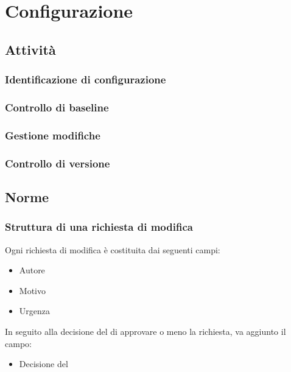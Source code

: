 \section{Configurazione}
	\subsection{Attività}
		\subsubsection{Identificazione di configurazione}
		\subsubsection{Controllo di baseline}
		\subsubsection{Gestione modifiche}
		\subsubsection{Controllo di versione}
	
	\subsection{Norme}
		\subsubsection{Struttura di una richiesta di modifica}
			Ogni richiesta di modifica è costituita dai seguenti campi:
			\begin{itemize}
				\item Autore
				\item Motivo
				\item Urgenza
			\end{itemize}
			In seguito alla decisione del  di approvare o meno la richiesta, va aggiunto il campo:
			\begin{itemize}
				\item Decisione del 
			\end{itemize}
			
